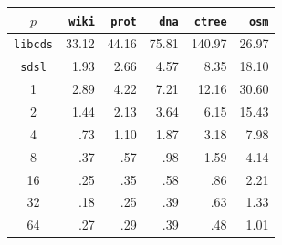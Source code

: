   {\noindent
  \begin{minipage}{\textwidth}
  \begin{minipage}[b]{0.48\textwidth}
      \begin{tabular}{c|rrrrr}
       $p$ & {\tt wiki} & {\tt prot} & {\tt dna} & {\tt ctree} & {\tt osm}\\
        \hline
        \hline
        {\tt libcds} & 33.12 & 44.16 & 75.81 & 140.97 & 26.97 \\
        {\tt sdsl} & 1.93 & 2.66 & 4.57 & 8.35 & 18.10 \\
        \hline
        1 & 2.89 & 4.22 & 7.21 & 12.16 & 30.60 \\
        2 & 1.44 & 2.13 & 3.64 & 6.15 & 15.43 \\
        4 &  .73 & 1.10 & 1.87 & 3.18 & 7.98 \\
        8 &  .37 &  .57 &  .98 & 1.59 & 4.14 \\
        16 &  .25 &  .35 &  .58 &  .86 & 2.21 \\
        32 &  .18 &  .25 &  .39 &  .63 & 1.33 \\
        64 &  .27 &  .29 &  .39 &  .48 & 1.01 \\
         \hline
      \end{tabular}
      \label{tbl:parallelTimes}
    \end{minipage}

\end{minipage}}
